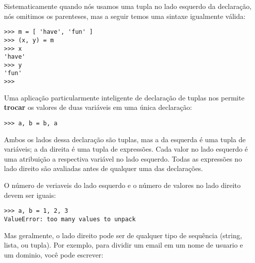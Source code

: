 Sistematicamente quando nós usamos uma tupla no lado esquerdo da declaração,
nós omitimos os parenteses, mas a seguir temos uma sintaxe igualmente válida:

\beforeverb
\begin{verbatim}
>>> m = [ 'have', 'fun' ]
>>> (x, y) = m
>>> x
'have'
>>> y
'fun'
>>> 
\end{verbatim}
\afterverb
%
Uma aplicação particularmente inteligente de declaração de tuplas nos permite
{\bf trocar} os valores de duas variáveis em uma única declaração:

\beforeverb
\begin{verbatim}
>>> a, b = b, a
\end{verbatim}
\afterverb
%
Ambos os lados dessa declaração são tuplas, mas a da esquerda é uma tupla de
variáveis; a da direita é uma tupla de expressões. Cada valor no lado esquerdo
é uma atribuição a respectiva variável no lado esquerdo. Todas as expressões
no lado direito são avaliadas antes de qualquer uma das declarações.

O número de veriaveis do lado esquerdo e o número de valores
no lado direito devem ser iguais:


\beforeverb
\begin{verbatim}
>>> a, b = 1, 2, 3
ValueError: too many values to unpack
\end{verbatim}
\afterverb
%
Mas geralmente, o lado direito pode ser de qualquer tipo de sequência
(string, lista, ou tupla). Por exemplo, para dividir um email em
um nome de usuario e um dominio, você pode escrever:

